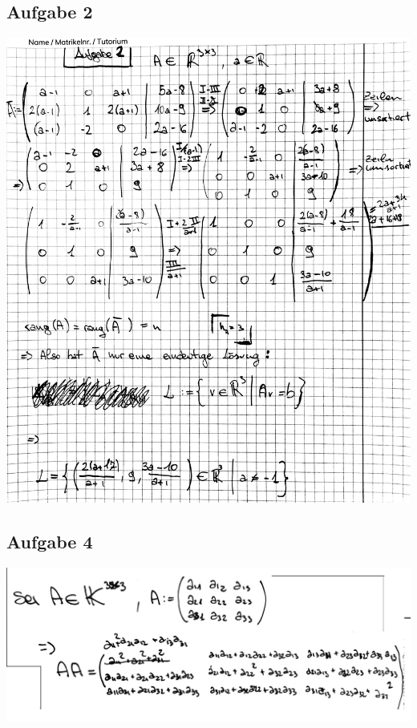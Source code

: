 \documentclass[10pt,a4paper]{article}
\begin{document}
\newpage
\subsection{Aufgabe 2} 
\includegraphics[scale=0.2]{1_2.jpg} 

\newpage
\subsection{Aufgabe 4}
\includegraphics[scale=0.15]{lat3_4_1.jpg} 
\end{document}

